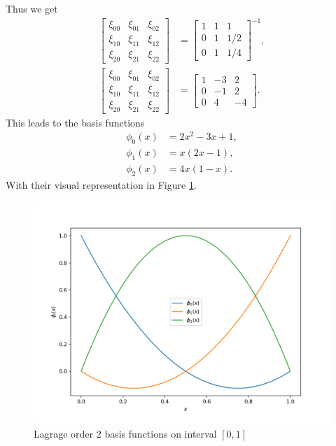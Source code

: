 \documentclass[12pt]{ociamthesis}
\begin{document}
Thus we get 
\begin{align}
\left[ \begin{matrix}
\xi_{00} & \xi_{01} & \xi_{02} \\
\xi_{10} & \xi_{11} & \xi_{12} \\
\xi_{20} & \xi_{21} & \xi_{22} 
\end{matrix} \right] &= 
\left[ \begin{matrix}
1 & 1 & 1 \\
0 & 1 & 1/2 \\
0 & 1 & 1/4
\end{matrix} \right]^{-1}, \\
\left[ \begin{matrix}
\xi_{00} & \xi_{01} & \xi_{02} \\
\xi_{10} & \xi_{11} & \xi_{12} \\
\xi_{20} & \xi_{21} & \xi_{22} 
\end{matrix} \right] &= 
\left[ \begin{matrix}
1 & -3 & 2 \\
0 & -1 & 2 \\
0 & 4 & -4
\end{matrix} \right].
\end{align}
This leads to the basis functions
\begin{align}
\phi_0(x) &= 2x^2-3x+1,\\
\phi_1(x) &= x(2x-1),\\
\phi_2(x) &= 4x(1-x).
\end{align}
With their visual representation in Figure \ref{InterFuncs}.
\begin{figure}[H]
     \includegraphics[width=\textwidth]{Pics/BasisFunc/IntervalFuncs.png}
     \caption{Lagrage order 2 basis functions  on interval $[0,1]$}
     \label{InterFuncs}
\end{figure}
\end{document}
